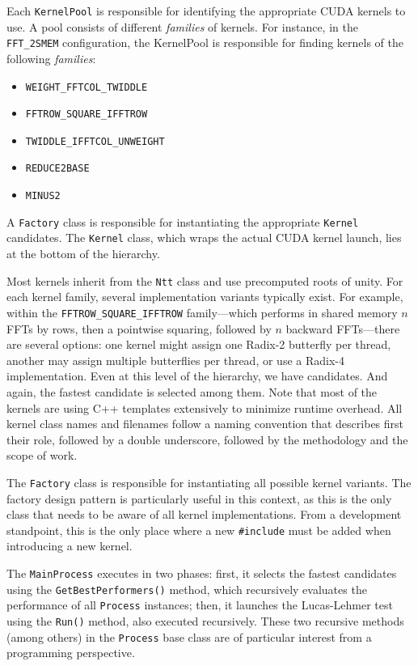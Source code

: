 \documentclass{article}
\begin{document}
Each \texttt{KernelPool} is responsible for identifying the appropriate CUDA kernels to use. A pool consists of different \emph{families} of kernels. For instance, in the \texttt{FFT\_2SMEM} configuration, the KernelPool is responsible for finding kernels of the following \emph{families}:
\begin{itemize}
    \item \texttt{WEIGHT\_FFTCOL\_TWIDDLE}
    \item \texttt{FFTROW\_SQUARE\_IFFTROW}
    \item \texttt{TWIDDLE\_IFFTCOL\_UNWEIGHT}
    \item \texttt{REDUCE2BASE}
    \item \texttt{MINUS2}
\end{itemize}
A \texttt{Factory} class is responsible for instantiating the appropriate \texttt{Kernel} candidates. The \texttt{Kernel} class, which wraps the actual CUDA kernel launch, lies at the bottom of the hierarchy. 

\newpage
Most kernels inherit from the \texttt{Ntt} class and use precomputed roots of unity. For each kernel family, several implementation variants typically exist. For example, within the \texttt{FFTROW\_SQUARE\_IFFTROW} family—which performs in shared memory $n$ FFTs by rows, then a pointwise squaring, followed by $n$ backward FFTs—there are several options: one kernel might assign one Radix-2 butterfly per thread, another may assign multiple butterflies per thread, or use a Radix-4 implementation. Even at this level of the hierarchy, we have candidates. And again, the fastest candidate is selected among them. Note that most of the kernels are using C++ templates extensively to minimize runtime overhead. All kernel class names and filenames follow a naming convention that describes first their role, followed by a double underscore, followed by the methodology and the scope of work.

The \texttt{Factory} class is responsible for instantiating all possible kernel variants. The factory design pattern is particularly useful in this context, as this is the only class that needs to be aware of all kernel implementations. From a development standpoint, this is the only place where a new \texttt{\#include} must be added when introducing a new kernel.

The \texttt{MainProcess} executes in two phases: first, it selects the fastest candidates using the \texttt{GetBestPerformers()} method, which recursively evaluates the performance of all \texttt{Process} instances; then, it launches the Lucas-Lehmer test using the \texttt{Run()} method, also executed recursively. These two recursive methods (among others) in the \texttt{Process} base class are of particular interest from a programming perspective.
\end{document}

